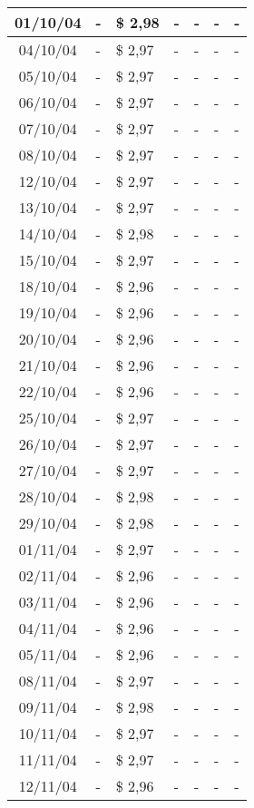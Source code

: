 \begin{center}
\begin{longtable}{|c|p{1.5cm}|p{1.5cm}|p{1.5cm}|p{1.5cm}|p{1.5cm}|p{1.5cm}|}
01/10/04 & - & \$ 2,98 & - & - & - & - \\ \hline
04/10/04 & - & \$ 2,97 & - & - & - & - \\ \hline
05/10/04 & - & \$ 2,97 & - & - & - & - \\ \hline
06/10/04 & - & \$ 2,97 & - & - & - & - \\ \hline
07/10/04 & - & \$ 2,97 & - & - & - & - \\ \hline
08/10/04 & - & \$ 2,97 & - & - & - & - \\ \hline
12/10/04 & - & \$ 2,97 & - & - & - & - \\ \hline
13/10/04 & - & \$ 2,97 & - & - & - & - \\ \hline
14/10/04 & - & \$ 2,98 & - & - & - & - \\ \hline
15/10/04 & - & \$ 2,97 & - & - & - & - \\ \hline
18/10/04 & - & \$ 2,96 & - & - & - & - \\ \hline
19/10/04 & - & \$ 2,96 & - & - & - & - \\ \hline
20/10/04 & - & \$ 2,96 & - & - & - & - \\ \hline
21/10/04 & - & \$ 2,96 & - & - & - & - \\ \hline
22/10/04 & - & \$ 2,96 & - & - & - & - \\ \hline
25/10/04 & - & \$ 2,97 & - & - & - & - \\ \hline
26/10/04 & - & \$ 2,97 & - & - & - & - \\ \hline
27/10/04 & - & \$ 2,97 & - & - & - & - \\ \hline
28/10/04 & - & \$ 2,98 & - & - & - & - \\ \hline
29/10/04 & - & \$ 2,98 & - & - & - & - \\ \hline
01/11/04 & - & \$ 2,97 & - & - & - & - \\ \hline
02/11/04 & - & \$ 2,96 & - & - & - & - \\ \hline
03/11/04 & - & \$ 2,96 & - & - & - & - \\ \hline
04/11/04 & - & \$ 2,96 & - & - & - & - \\ \hline
05/11/04 & - & \$ 2,96 & - & - & - & - \\ \hline
08/11/04 & - & \$ 2,97 & - & - & - & - \\ \hline
09/11/04 & - & \$ 2,98 & - & - & - & - \\ \hline
10/11/04 & - & \$ 2,97 & - & - & - & - \\ \hline
11/11/04 & - & \$ 2,97 & - & - & - & - \\ \hline
12/11/04 & - & \$ 2,96 & - & - & - & - \\ \hline

\end{longtable}
\end{center}
